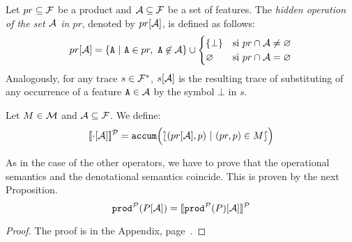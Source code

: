 \bdfn
  Let $pr\subseteq{\cal F}$ be a product and ${\cal A}\subseteq{\cal F}$
  be a set of features. The \emph{hidden operation of the set ${\cal A}$
    in $pr$}, denoted by $pr[{\cal A}]$, is defined as follows:
  \begin{displaymath}
    pr\hide{\calA} = \{\fA\ |\ \fA\in pr,\
    \fA\not\in\calA\}\cup
    \begin{cases}
      \{\bot\} & \mbox{si } pr\cap\calA\neq\emptyset\\
      \emptyset & \mbox{si } pr\cap\calA=\emptyset\\
    \end{cases}
  \end{displaymath}
  Analogously, for any trace $s\in{\cal F}^{*}$, $s[{\cal A}]$ is the
  resulting
  trace of
  substituting of any  occurrence of a feature ${\mathtt{A}}\in{\cal A}$ by
  the symbol $\bot$ in $s$.
\edfn

\bdfn
  Let $M\in{\cal M}$ and ${\cal A}\subseteq{\cal F}$. We define:
  \begin{displaymath}
    [\![\cdot[{\cal A}]]\!]^{\cal P} = \mathtt{accum}\Bigl(\lbag(pr[{\cal A}],p)\
    |\ (pr,p)\in M\rbag \Bigr)
  \end{displaymath}
\edfn

As in the case of the other operators, we have to prove that the
operational semantics and the denotational semantics coincide. This is
proven by the next Proposition.
\bprop\label{prop:hid}
  \begin{displaymath}
    \mathtt{prod}^{\cal P}(P[{\cal A}])  = [\![\mathtt{prod}^{\cal P}(P)[{\cal A}]]\!]^{\cal P}
  \end{displaymath}
  \begin{proof}
    The proof is in the Appendix, page~\pageref{prof:prop:hid}.
  \end{proof}
\eprop


